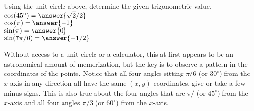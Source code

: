 \documentclass{ximera}
\begin{document}
\begin{example}
Using the unit circle above, determine the given trigonometric value.
\\$\cos(45^{\circ})=\answer{\sqrt{2}/2}$
\\$\cos(\pi)=\answer{-1}$
\\$\sin(\pi)=\answer{0}$
\\$\sin(7\pi/6)=\answer{-1/2}$
\end{example}

Without access to a unit circle or a calculator, this at first appears to be an astronomical amount of memorization, but the key is to observe a pattern in the coordinates of the points. Notice that all four angles sitting $\pi/6$ (or $30^{\circ}$) from the $x$-axis in any direction all have the same $(x,y)$ coordinates, give or take a few minus signs. This is also true about the four angles that are $\pi/$ (or $45^{\circ}$) from the $x$-axis and all four angles $\pi/3$ (or $60^{\circ}$) from the $x$-axis.

\begin{image}
 \end{image}
    
\end{document}

